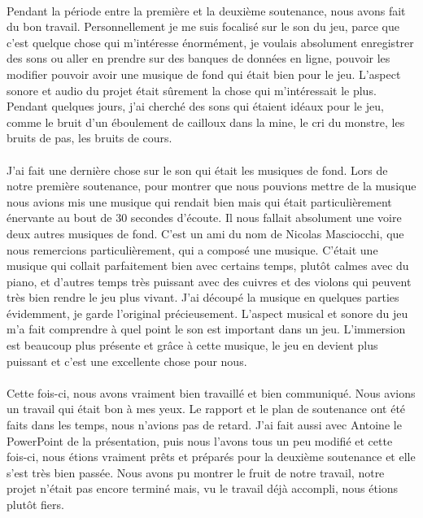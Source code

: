 \documentclass[titlepage, 13px, a4paper]{report}
\begin{document}
\paragraph*{} \hspace{0pt}
Pendant la période entre la première et la deuxième soutenance, 
nous avons fait du bon travail. Personnellement je me suis focalisé sur 
le son du jeu, parce que c’est quelque chose qui m’intéresse énormément, je voulais absolument enregistrer 
des sons ou aller en prendre sur des banques de données en ligne, pouvoir les modifier pouvoir avoir une 
musique de fond qui était bien pour le jeu. L’aspect sonore et audio du projet était sûrement 
la chose qui m’intéressait le plus. Pendant quelques jours, j’ai cherché des sons qui étaient idéaux pour le jeu, 
comme le bruit d’un éboulement de cailloux dans la mine, le cri du monstre, les bruits de pas, les bruits de cours. \\ \\
J’ai fait une dernière chose sur le son qui était les musiques de fond. 
Lors de notre première soutenance, pour montrer que nous pouvions mettre de la 
musique nous avions mis une musique qui rendait bien mais qui était particulièrement énervante au bout de 30 secondes 
d’écoute. Il nous fallait absolument une voire deux autres musiques de fond. C’est un ami du nom de 
Nicolas Masciocchi, que nous remercions particulièrement, qui a composé une musique. C’était une musique 
qui collait parfaitement bien avec certains temps, plutôt calmes avec du piano, et d’autres temps très puissant 
avec des cuivres et des violons qui peuvent très bien rendre le jeu plus vivant. J’ai découpé la musique en 
quelques parties évidemment, je garde l’original précieusement. L’aspect musical et sonore du jeu m’a fait 
comprendre à quel point le son est important dans un jeu. L’immersion est beaucoup plus présente et grâce à 
cette musique, le jeu en devient plus puissant et c’est une excellente chose pour nous. \\ \\
Cette fois-ci, nous avons vraiment bien travaillé et bien communiqué. Nous avions un travail qui était bon à mes yeux. 
Le rapport et le plan de soutenance ont été faits dans les temps, nous n’avions pas de retard. J’ai fait aussi avec 
Antoine le PowerPoint de la présentation, puis nous l’avons tous un peu modifié et cette fois-ci, nous étions vraiment 
prêts et préparés pour la deuxième soutenance et elle s’est très bien passée. Nous avons pu montrer le fruit de notre 
travail, notre projet n’était pas encore terminé mais, vu le travail déjà accompli, nous étions plutôt fiers. \\
\end{document}
